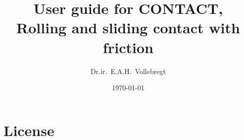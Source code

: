 \documentclass[12pt]{report}
\title{User guide for CONTACT,\\
       Rolling and sliding contact with friction}
\author{Dr.ir.\ E.A.H.\ Vollebregt}
\date{\today}
\renewcommand{\magenta}[1]{}
\begin{document}
\pagestyle{vtrep}
\maketitle


\magenta{
\begin{vtlogsheet}
\vtlogentry{1.135}{EV}{01-08-2022}{Version for release v22.1}{}
\vtlogentry{1.136}{EV}{08-08-2022}{Added slcs-file for switches and crossings}{}
\vtlogentry{1.137}{EV}{13-08-2022}{Added turning of contact reference angle}{}
\vtlogentry{1.138}{EV}{27-10-2022}{Added xrange and xysteps to plot3d}{}
\vtlogentry{1.139}{EV}{17-11-2022}{Extended slcs-file for parts-information}{}
\vtlogentry{1.140}{EV}{15-12-2022}{Version for release v22.2}{}
\vtlogentry{1.141}{EV}{02-03-2023}{Added {\tt S\_METHOD} for approximating
        spline}{}
\vtlogentry{1.142}{EV}{20-03-2023}{Correction format {\tt slcs}-file}{}
\vtlogentry{1.143}{EV}{20-03-2023}{Added {\tt NPOT\_MAX}}{}
\vtlogentry{1.144}{EV}{23-03-2023}{Added ${\tt D}=6,8,9$}{}
\vtlogentry{1.145}{EV}{14-04-2023}{Version for release v23.1}{}
\vtlogentry{1.146}{EV}{10-05-2023}{Added massless rail deflection ${\tt 
        F}_1=3$}{}
\vtlogentry{1.147}{EV}{19-06-2023}{Changed cntc\_getprofilevalues}{}
\vtlogentry{1.148}{EV}{31-07-2023}{Added configuration of debug outputs}{}
\vtlogentry{1.149}{EV}{11-08-2023}{Added ${\tt D}=7$ using initial contact
        position}{}
\vtlogentry{1.150}{EV}{16-08-2023}{Added comment on slice feature positions}{}
\vtlogentry{1.151}{EV}{23-08-2023}{Clear out-file upon new initialization}{}
\vtlogentry{1.152}{EV}{12-09-2023}{Delete arc-fit, add conversion formulas}{}
\vtlogentry{1.153}{EV}{04-10-2023}{Added wheel slices file}{}
\vtlogentry{1.154}{EV}{24-10-2023}{Add description of {\tt
        cntc\_getcpresults}}{}
\vtlogentry{1.155}{EV}{03-11-2023}{Version for release v23.2}{}
\vtfilelocation{$<$svn-contc$>$/contact/doc}
\end{vtlogsheet}
}


\tableofcontents

\clearpage
\chapter*{License}
\end{document}
